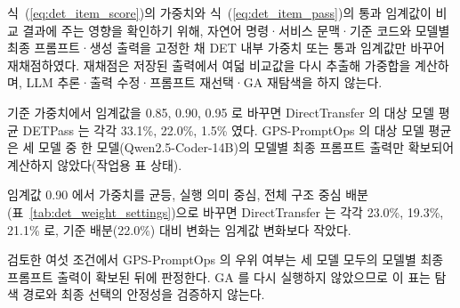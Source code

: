 

식~(\ref{eq:det_item_score})의 가중치와 식~(\ref{eq:det_item_pass})의 통과 임계값이 비교 결과에 주는 영향을 확인하기 위해, 자연어 명령·서비스 문맥·기준 코드와 모델별 최종 프롬프트·생성 출력을 고정한 채 DET 내부 가중치 또는 통과 임계값만 바꾸어 재채점하였다. 재채점은 저장된 출력에서 여덟 비교값을 다시 추출해 가중합을 계산하며, LLM 추론·출력 수정·프롬프트 재선택·GA 재탐색을 하지 않는다.

기준 가중치에서 임계값을 0.85, 0.90, 0.95 로 바꾸면 DirectTransfer 의 대상 모델 평균 DETPass 는 각각 33.1\%, 22.0\%, 1.5\% 였다. GPS-PromptOps 의 대상 모델 평균은 세 모델 중 한 모델(Qwen2.5-Coder-14B)의 모델별 최종 프롬프트 출력만 확보되어 계산하지 않았다(작업용 표 상태). 

임계값 0.90 에서 가중치를 균등, 실행 의미 중심, 전체 구조 중심 배분(표~\ref{tab:det_weight_settings})으로 바꾸면 DirectTransfer 는 각각 23.0\%, 19.3\%, 21.1\% 로, 기준 배분(22.0\%) 대비 변화는 임계값 변화보다 작았다.

검토한 여섯 조건에서 GPS-PromptOps 의 우위 여부는 세 모델 모두의 모델별 최종 프롬프트 출력이 확보된 뒤에 판정한다. GA 를 다시 실행하지 않았으므로 이 표는 탐색 경로와 최종 선택의 안정성을 검증하지 않는다.

